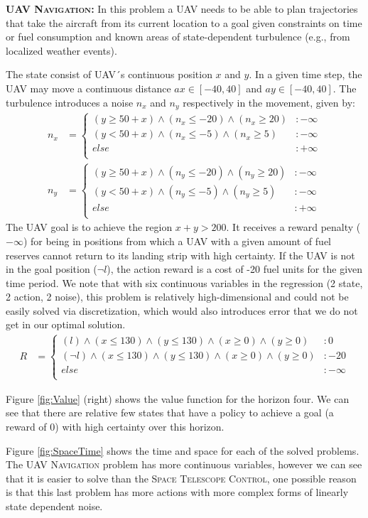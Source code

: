 {\bf \textsc{UAV Navigation}:}
In this problem a UAV needs to be able to plan trajectories that take
the aircraft from its current location to a goal given constraints on
time or fuel consumption and known areas of state-dependent turbulence
(e.g., from localized weather events).

The state consist of UAV´s continuous position $x$ and $y$.
In a given time step, the UAV may move a continuous distance $ax \in [-40,40]$ and $ay \in [-40,40]$. The turbulence introduces a noise $n_x$ and $n_y$ respectively in the movement, given by:
{\footnotesize
\begin{align*}
n_x & = \begin{cases}
(y \geq 50 + x) \wedge (n_x \leq -20) \wedge (n_x \geq 20) &:-\infty\\
(y < 50 + x) \wedge (n_x \leq -5) \wedge (n_x \geq 5) &:-\infty\\
else &: +\infty\\
\end{cases}\\
n_y & = \begin{cases}
(y \geq 50 + x) \wedge (n_y \leq -20) \wedge (n_y \geq 20) &:-\infty\\
(y < 50 + x) \wedge (n_y \leq -5) \wedge (n_y \geq 5) &:-\infty\\
else &: +\infty\\
\end{cases}
\end{align*}}
The UAV goal is to achieve the region $x+y > 200$. It receives a
reward penalty ($-\infty$) for being in positions from which a UAV
with a given amount of fuel reserves cannot return to its landing
strip with high certainty. 
If the UAV is not in the goal position ($\neg l$), the action
reward is a cost of -20 fuel units for the given time period.  We note that
with six continuous variables in the regression (2 state, 2 action, 2 noise),
this problem is relatively high-dimensional and could not be easily solved
via discretization, which would also introduces error that we do not get
in our optimal solution.
{\footnotesize
\begin{align*}
R & = \begin{cases}
(l) \wedge (x \leq 130) \wedge (y \leq 130) \wedge (x \geq 0) \wedge (y \geq 0) & \!\! :0\\
(\neg l) \wedge (x \leq 130) \wedge (y \leq 130) \wedge (x \geq 0) \wedge (y \geq 0) & \!\! :-20\\
else &: -\infty\\
\end{cases}
\end{align*}}

Figure \ref{fig:Value} (right) shows the value function for the
horizon four. We can see that there are relative few states that have
a policy to achieve a goal (a reward of 0) with high certainty over
this horizon.

Figure \ref{fig:SpaceTime} shows the time and space for each of the
solved problems.  The \textsc{UAV Navigation} problem has more
continuous variables, however we can see that it is easier to solve
than the \textsc{Space Telescope Control}, one possible reason is that
this last problem has more actions with more complex forms of linearly
state dependent noise.
